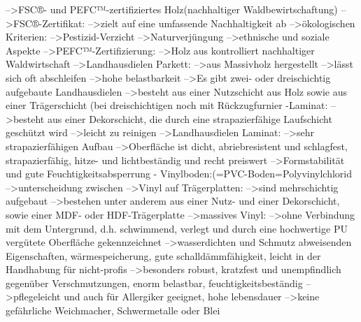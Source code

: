                         -->FSC®- und PEFC™-zertifiziertes Holz(nachhaltiger Waldbewirtschaftung)
                            -->FSC®-Zertifikat:
                                -->zielt auf eine umfassende Nachhaltigkeit ab
                                -->ökologischen Kriterien:
                                    -->Pestizid-Verzicht 
                                    -->Naturverjüngung
                                -->ethnische und soziale Aspekte
                            -->PEFC™-Zertifizierung:
                                -->Holz aus kontrolliert nachhaltiger Waldwirtschaft
                        -->Landhausdielen Parkett: 
                            -->aus Massivholz hergestellt
                            -->lässt sich oft abschleifen
                            -->hohe belastbarkeit
                            -->Es gibt zwei- oder dreischichtig aufgebaute Landhausdielen
                                -->besteht aus einer Nutzschicht aus Holz sowie aus einer Trägerschicht (bei dreischichtigen noch mit Rückzugfurnier
                    -Laminat:
                        -->besteht aus einer Dekorschicht, die durch eine strapazierfähige Laufschicht geschützt wird
                        -->leicht zu reinigen
                        -->Landhausdielen Laminat:
                            -->sehr strapazierfähigen Aufbau
                        -->Oberfläche ist dicht, abriebresistent und schlagfest, strapazierfähig, hitze- und lichtbeständig und recht preiswert
                        -->Formstabilität und gute Feuchtigkeitsabsperrung
                    - Vinylboden:(=PVC-Boden=Polyvinylchlorid
                        -->unterscheidung zwischen
                            -->Vinyl auf Trägerplatten: 
                                -->sind mehrschichtig aufgebaut
                                -->bestehen unter anderem aus einer Nutz- und einer Dekorschicht, sowie einer MDF- oder HDF-Trägerplatte
                            -->massives Vinyl:
                                -->ohne Verbindung mit dem Untergrund, d.h. schwimmend, verlegt und durch eine hochwertige PU vergütete Oberfläche gekennzeichnet
                        -->wasserdichten und Schmutz abweisenden Eigenschaften, wärmespeicherung, gute schalldämmfähigkeit, leicht in der Handhabung für nicht-profis
                        -->besonders robust, kratzfest und unempfindlich gegenüber Verschmutzungen, enorm belastbar, feuchtigkeitsbeständig
                        -->pflegeleicht und auch für Allergiker geeignet, hohe lebensdauer
                        -->keine gefährliche Weichmacher, Schwermetalle oder Blei
